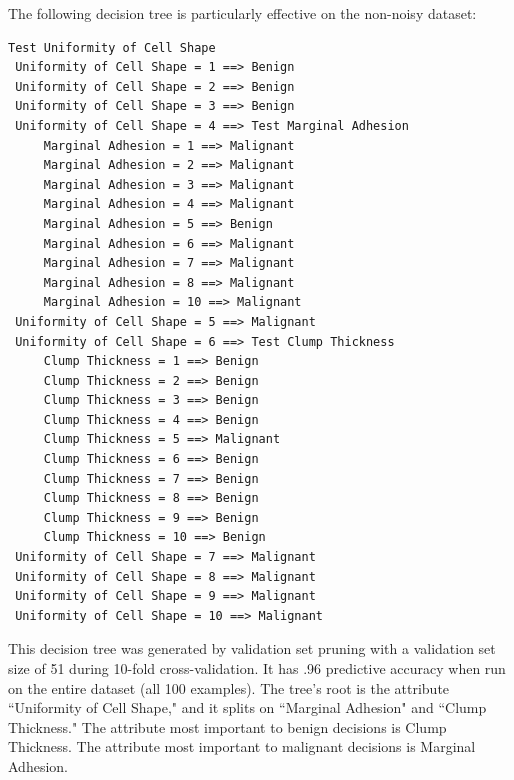 \documentclass[solution, letterpaper]{cs121}
\begin{document}
The following decision tree is particularly effective on the non-noisy dataset:
\begin{verbatim}
Test Uniformity of Cell Shape
 Uniformity of Cell Shape = 1 ==> Benign
 Uniformity of Cell Shape = 2 ==> Benign
 Uniformity of Cell Shape = 3 ==> Benign
 Uniformity of Cell Shape = 4 ==> Test Marginal Adhesion
     Marginal Adhesion = 1 ==> Malignant
     Marginal Adhesion = 2 ==> Malignant
     Marginal Adhesion = 3 ==> Malignant
     Marginal Adhesion = 4 ==> Malignant
     Marginal Adhesion = 5 ==> Benign
     Marginal Adhesion = 6 ==> Malignant
     Marginal Adhesion = 7 ==> Malignant
     Marginal Adhesion = 8 ==> Malignant
     Marginal Adhesion = 10 ==> Malignant
 Uniformity of Cell Shape = 5 ==> Malignant
 Uniformity of Cell Shape = 6 ==> Test Clump Thickness
     Clump Thickness = 1 ==> Benign
     Clump Thickness = 2 ==> Benign
     Clump Thickness = 3 ==> Benign
     Clump Thickness = 4 ==> Benign
     Clump Thickness = 5 ==> Malignant
     Clump Thickness = 6 ==> Benign
     Clump Thickness = 7 ==> Benign
     Clump Thickness = 8 ==> Benign
     Clump Thickness = 9 ==> Benign
     Clump Thickness = 10 ==> Benign
 Uniformity of Cell Shape = 7 ==> Malignant
 Uniformity of Cell Shape = 8 ==> Malignant
 Uniformity of Cell Shape = 9 ==> Malignant
 Uniformity of Cell Shape = 10 ==> Malignant
 \end{verbatim}

This decision tree was generated by validation set pruning with a validation set size of 51 during 10-fold cross-validation. It has .96 predictive accuracy when run on the entire dataset (all 100 examples). The tree's root is the attribute ``Uniformity of Cell Shape," and it splits on ``Marginal Adhesion" and ``Clump Thickness." The attribute most important to benign decisions is Clump Thickness. The attribute most important to malignant decisions is Marginal Adhesion.
\end{document}
